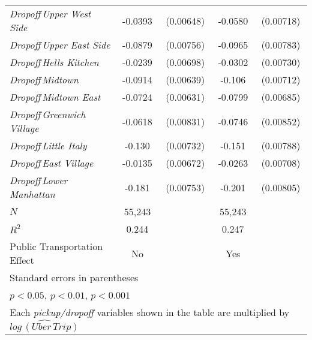 \begin{table}[h]
{\begin{center}
\begin{tabular}{l*{2}{cc}}
\hspace{3cm}\textit{Dropoff\,Upper West Side}&     -0.0393\sym{***}&   (0.00648)&     -0.0580\sym{***}&   (0.00718)\\
\hspace{3cm}\textit{Dropoff\,Upper East Side}&     -0.0879\sym{***}&   (0.00756)&     -0.0965\sym{***}&   (0.00783)\\
\hspace{3cm}\textit{Dropoff\,Hells Kitchen}&     -0.0239\sym{***}&   (0.00698)&     -0.0302\sym{***}&   (0.00730)\\
\hspace{3cm}\textit{Dropoff\,Midtown}&     -0.0914\sym{***}&   (0.00639)&      -0.106\sym{***}&   (0.00712)\\
\hspace{3cm}\textit{Dropoff\,Midtown East}&     -0.0724\sym{***}&   (0.00631)&     -0.0799\sym{***}&   (0.00685)\\
\hspace{3cm}\textit{Dropoff\,Greenwich Village}&     -0.0618\sym{***}&   (0.00831)&     -0.0746\sym{***}&   (0.00852)\\
\hspace{3cm}\textit{Dropoff\,Little Italy}&      -0.130\sym{***}&   (0.00732)&      -0.151\sym{***}&   (0.00788)\\
\hspace{3cm}\textit{Dropoff\,East Village}&     -0.0135\sym{*}  &   (0.00672)&     -0.0263\sym{***}&   (0.00708)\\
\hspace{3cm}\textit{Dropoff\,Lower Manhattan}&      -0.181\sym{***}&   (0.00753)&      -0.201\sym{***}&   (0.00805)\\
\hline
\(N\)       &       55,243         &            &       55,243         &            \\
\(R^{2}\)   &       0.244         &            &       0.247         &            \\
Public Transportation Effect &       No            
               & &    Yes                 \\
\hline\hline
\multicolumn{5}{l}{\footnotesize Standard errors in parentheses}\\
\multicolumn{5}{l}{\footnotesize \sym{*} \(p<0.05\), \sym{**} \(p<0.01\), \sym{***} \(p<0.001\)}\\
\multicolumn{5}{l}{\footnotesize Each \textit{pickup/dropoff} variables shown in the table are multiplied by ${\widehat{log\, (Uber\,Trip)}}$}\\
\end{tabular}
\end{center}
}



\end{table}

